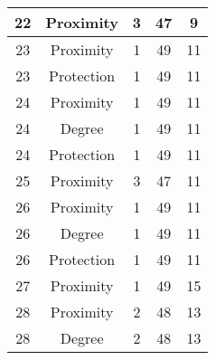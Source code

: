 \documentclass[results.tex]{subfiles}
\begin{document}
\begin{center}
\begin{tabular}{| c || c | c | c | c |}
            \hline
            22                      & Proximity                    & 3                      & 47                      & 9                    \\
            \hline
            23                      & Proximity                    & 1                      & 49                      & 11                   \\
            \hline
            23                      & Protection                   & 1                      & 49                      & 11                   \\
            \hline
            24                      & Proximity                    & 1                      & 49                      & 11                   \\
            \hline
            24                      & Degree                       & 1                      & 49                      & 11                   \\
            \hline
            24                      & Protection                   & 1                      & 49                      & 11                   \\
            \hline
            25                      & Proximity                    & 3                      & 47                      & 11                   \\
            \hline
            26                      & Proximity                    & 1                      & 49                      & 11                   \\
            \hline
            26                      & Degree                       & 1                      & 49                      & 11                   \\
            \hline
            26                      & Protection                   & 1                      & 49                      & 11                   \\
            \hline
            27                      & Proximity                    & 1                      & 49                      & 15                   \\
            \hline
            28                      & Proximity                    & 2                      & 48                      & 13                   \\
            \hline
            28                      & Degree                       & 2                      & 48                      & 13                   \\

\end{tabular}
\end{center}
\end{document}
